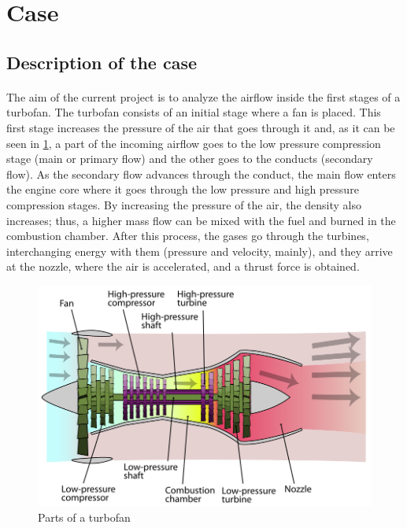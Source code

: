 \section{Case}

\subsection{Description of the case}

\paragraph{}The aim of the current project is to analyze the airflow inside the first stages of a turbofan. The turbofan consists of an initial stage where a fan is placed. This first stage increases the pressure of the air that goes through it and, as it can be seen in \ref{turbofanparts}, a part of the incoming airflow goes to the low pressure compression stage (main or primary flow) and the other goes to the conducts (secondary flow). As the secondary flow advances through the conduct, the main flow enters the engine core where it goes through the low pressure and high pressure compression stages. By increasing the pressure of the air, the density also increases; thus, a higher mass flow can be mixed with the fuel and burned in the combustion chamber. After this process, the gases go through the turbines, interchanging energy with them (pressure and velocity, mainly), and they arrive at the nozzle, where the air is accelerated, and a thrust force is obtained.

\begin{figure}[h!]
\centering
\includegraphics[scale=0.45]{./img/TurbofanEtapas.png}
\caption{Parts of a turbofan}
\label{turbofanparts}
\end{figure}

